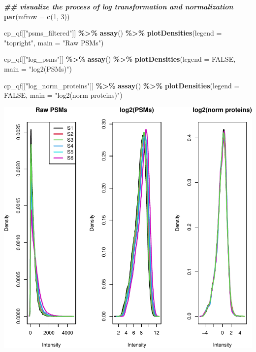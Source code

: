 \documentclass[9pt,a4paper,]{extarticle}
\newenvironment{Shaded}{\begin{snugshade}}{\end{snugshade}}
\newcommand{\AttributeTok}[1]{\textcolor[rgb]{0.13,0.29,0.53}{#1}}
\newcommand{\ConstantTok}[1]{\textcolor[rgb]{0.56,0.35,0.01}{#1}}
\newcommand{\DecValTok}[1]{\textcolor[rgb]{0.00,0.00,0.81}{#1}}
\newcommand{\DocumentationTok}[1]{\textcolor[rgb]{0.56,0.35,0.01}{\textbf{\textit{#1}}}}
\newcommand{\FunctionTok}[1]{\textcolor[rgb]{0.13,0.29,0.53}{\textbf{#1}}}
\newcommand{\NormalTok}[1]{#1}
\newcommand{\SpecialCharTok}[1]{\textcolor[rgb]{0.81,0.36,0.00}{\textbf{#1}}}
\newcommand{\StringTok}[1]{\textcolor[rgb]{0.31,0.60,0.02}{#1}}
\begin{document}
\begin{Shaded}
\begin{Highlighting}[]
\DocumentationTok{\#\# visualize the process of log transformation and normalization}
\FunctionTok{par}\NormalTok{(}\AttributeTok{mfrow =} \FunctionTok{c}\NormalTok{(}\DecValTok{1}\NormalTok{, }\DecValTok{3}\NormalTok{))}

\NormalTok{cp\_qf[[}\StringTok{"psms\_filtered"}\NormalTok{]] }\SpecialCharTok{\%\textgreater{}\%}
  \FunctionTok{assay}\NormalTok{() }\SpecialCharTok{\%\textgreater{}\%}
  \FunctionTok{plotDensities}\NormalTok{(}\AttributeTok{legend =} \StringTok{"topright"}\NormalTok{,}
                \AttributeTok{main =} \StringTok{"Raw PSMs"}\NormalTok{)}

\NormalTok{cp\_qf[[}\StringTok{"log\_psms"}\NormalTok{]] }\SpecialCharTok{\%\textgreater{}\%}
  \FunctionTok{assay}\NormalTok{() }\SpecialCharTok{\%\textgreater{}\%}
  \FunctionTok{plotDensities}\NormalTok{(}\AttributeTok{legend =} \ConstantTok{FALSE}\NormalTok{,}
                \AttributeTok{main =} \StringTok{"log2(PSMs)"}\NormalTok{)}

\NormalTok{cp\_qf[[}\StringTok{"log\_norm\_proteins"}\NormalTok{]] }\SpecialCharTok{\%\textgreater{}\%}
  \FunctionTok{assay}\NormalTok{() }\SpecialCharTok{\%\textgreater{}\%}
  \FunctionTok{plotDensities}\NormalTok{(}\AttributeTok{legend =} \ConstantTok{FALSE}\NormalTok{,}
                \AttributeTok{main =} \StringTok{"log2(norm proteins)"}\NormalTok{)}
\end{Highlighting}
\end{Shaded}

\begin{center}\includegraphics[width=0.9\linewidth]{workflow_expressions_files/figure-latex/tmt_transformations-1} \end{center}
\end{document}
